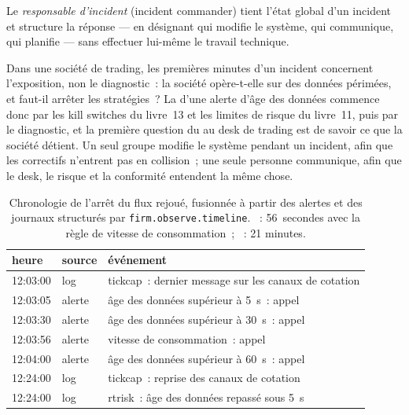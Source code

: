 \begin{definition}\label{def:pl:observability-and-incident-response:ic}
Le \emph{responsable d'incident} (incident commander) tient l'état global d'un incident et structure la réponse --- en désignant
qui modifie le système, qui communique, qui planifie --- sans effectuer lui-même le travail technique.
\end{definition}

Dans une société de trading, les premières minutes d'un incident concernent l'exposition, non le diagnostic~: la société opère-t-elle sur des données périmées, et faut-il arrêter
les stratégies~? La  d'une alerte d'âge des données commence donc par les kill switches du livre~13 et les limites de risque du livre~11, puis par
le diagnostic, et la première question du  au desk de trading est de savoir ce que la société détient. Un seul groupe modifie le système pendant un
incident, afin que les correctifs n'entrent pas en collision~; une seule personne communique, afin que le desk, le risque et la conformité entendent la même chose.

\begin{table}[htbp]
\centering\small
\begin{tabular}{lll}
\toprule
heure & source & événement\\
\midrule
12:03:00 & log & tickcap~: dernier message sur les canaux de cotation\\
12:03:05 & alerte & âge des données supérieur à 5~s~: appel\\
12:03:30 & alerte & âge des données supérieur à 30~s~: appel\\
12:03:56 & alerte & vitesse de consommation~: appel\\
12:04:00 & alerte & âge des données supérieur à 60~s~: appel\\
12:24:00 & log & tickcap~: reprise des canaux de cotation\\
12:24:00 & log & rtrisk~: âge des données repassé sous 5~s\\
\bottomrule
\end{tabular}
\caption{Chronologie de l'arrêt du flux rejoué, fusionnée à partir des alertes et des journaux structurés par \texttt{firm.observe.timeline}. ~:
56~secondes avec la règle de vitesse de consommation~; ~: 21 minutes.}\label{tab:pl:observability-and-incident-response:timeline}
\end{table}

